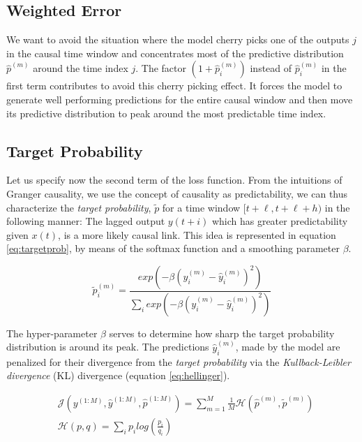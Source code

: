 \documentclass[twoside]{article}
\begin{document}
\subsection{Weighted Error}

We want to avoid the situation where the model cherry picks one of the outputs $j$ in the causal time window and concentrates most of the predictive distribution $\hat p^{(m)}$ around the time index $j$. 
The factor $(1+\hat p_i^{(m)})$ instead of $\hat p_i^{(m)}$ in the first term contributes 
to avoid this cherry picking effect. It forces the model to generate well performing
predictions for the entire causal window and then move its predictive distribution
to peak around the most predictable time index.

\subsection{Target Probability}

Let us specify now the second term of the loss function.
From the intuitions of Granger causality, we use the concept of causality as predictability, we can thus characterize the \emph{target probability}, $\widetilde{p}$ for a time window $[t+\ell, t+\ell+h)$ in the following manner: The lagged output $y(t+i)$ which has greater predictability given $x(t)$, is a more likely causal link. This idea is represented in equation \ref{eq:targetprob}, by means of the softmax function and a smoothing parameter $\beta$.

\begin{equation}\label{eq:targetprob}
\widetilde{p}_{i}^{(m)} = \frac{exp \left(- \beta (y_{i}^{(m)} - \hat{y}_{i}^{(m)})^{2} \right)}{\sum_{i}{exp \left(- \beta (y_{i}^{(m)} - \hat{y}_{i}^{(m)})^{2} \right)}} 
\end{equation}

The hyper-parameter $\beta$ serves to determine how sharp the target probability distribution is around its peak. The predictions $\hat{y}^{(m)}_{i}$, made by the model are penalized for their divergence from the \emph{target probability} via the \emph{Kullback-Leibler divergence} (KL) divergence (equation \ref{eq:hellinger}).

\begin{align}\label{eq:prior}
& \mathcal{J}(y^{(1:M)}, \hat{y}^{(1:M)}, \hat{p}^{(1:M)}) = \sum_{m = 1}^{M}{\frac{1}{M} \mathcal{H}(\hat{p}^{(m)}, \widetilde{p}^{(m)})} \\
& \mathcal{H}(p, q) = \sum_{i}{p_{i}log \left (\frac{p_i}{q_i} \right)} \label{eq:hellinger}
\end{align}
\end{document}
